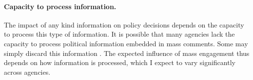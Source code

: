 



\paragraph{Capacity to process information.} The impact of any kind information on policy decisions depends on the capacity to process this type of information.
It is possible that many agencies lack the capacity to process political information embedded in mass comments. Some may simply discard this information \citep{Mendelson2011}. The expected influence of mass engagement thus depends on how information is processed, which I expect to vary significantly across agencies. 






 






